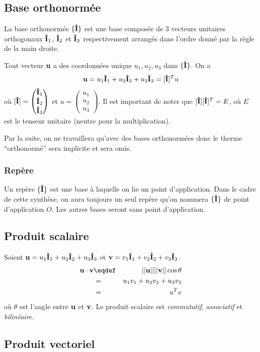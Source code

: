\subsection{Base orthonormée}
La base orthonormée $\{{\bf\hat{I}}\}$ est une base composée de 3 vecteurs unitaires orthogonaux ${\bf\hat{I}}_1$, ${\bf\hat{I}}_2$ et ${\bf\hat{I}}_3$ respectivement arrangés dans l'ordre donné par la règle de la main droite.

Tout vecteur ${\bf u}$ a des coordonnées unique $u_1, u_2, u_3$ dans $\{{\bf\hat{I}}\}$.
On a
\[ {\bf u} = u_1{\bf\hat{I}}_1 + u_2{\bf\hat{I}}_2 + u_3{\bf\hat{I}}_3 = [{\bf\hat{I}}]^T u \]
	où $[{\bf\hat{I}}] = \begin{pmatrix}{\bf\hat{I}}_1\\{\bf\hat{I}}_2\\{\bf\hat{I}}_3\end{pmatrix}$ et $u = \begin{pmatrix} u_1 \\ u_2 \\ u_3 \end{pmatrix}$.
Il est important de noter que $[{\bf\hat{I}}][{\bf\hat{I}}]^T = E$, où $E$ est le tenseur unitaire (neutre pour la multiplication).

Par la suite, on ne travaillera qu'avec des bases orthonormées donc le therme ``orthonormé'' sera implicite et sera omis.

\subsubsection{Repère}
Un repère $\{{\bf\hat{I}}\}$ est une base à laquelle on lie un point d'application.
Dans le cadre de cette synthèse, on aura toujours un seul repère qu'on nommera $\{{\bf\hat{I}}\}$ de point d'application $O$.
Les autres bases seront sans point d'application.

\subsection{Produit scalaire}
Soient ${\bf u} = u_1{\bf\hat{I}}_1 + u_2{\bf\hat{I}}_2 + u_3{\bf\hat{I}}_3$ et ${\bf v} = v_1{\bf\hat{I}}_1 + v_2{\bf\hat{I}}_2 + v_3{\bf\hat{I}}_3$.
\begin{eqnarray*}
	\fv{u}\cdot\fv{v} & \eqdef & ||\fv{u}|| ||\fv{v}|| \cos\theta\\
	& = & u_1v_1 + u_2v_2 + u_3v_3\\
	& = & u^T v
\end{eqnarray*}
où $\theta$ est l'angle entre ${\bf u}$ et ${\bf v}$.
Le produit scalaire est {\em commutatif}, {\em associatif} et {\em bilinéaire}.

\subsection{Produit vectoriel}

